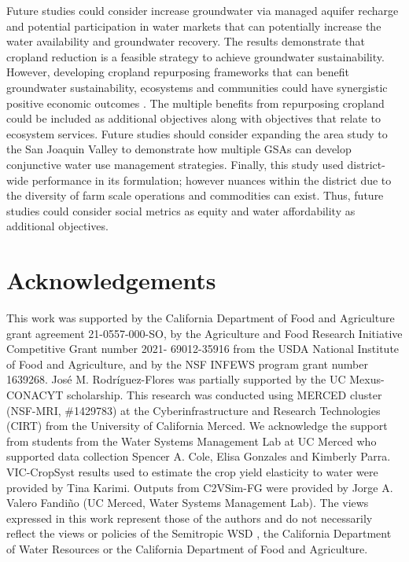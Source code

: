 \documentclass[a4paper,fleqn]{cas-sc}
\begin{document}
Future studies could consider increase groundwater via managed aquifer recharge \citep{alam_can_2020} and potential participation in water markets \citep{arellano-gonzalez_adaptive_2021,hanak_water_2019} that can potentially increase the water availability and groundwater recovery. The results demonstrate that cropland reduction is a feasible strategy to achieve groundwater sustainability. However, developing cropland repurposing frameworks that can benefit groundwater sustainability, ecosystems and communities could have synergistic positive economic outcomes \citep{biggs_landowner_2022,fernandez-bou_water_2023,espinoza_fallow_2023}. The multiple benefits from repurposing cropland could be included as additional objectives along with objectives that relate to ecosystem services. Future studies should consider expanding the area study to the San Joaquin Valley to demonstrate how multiple GSAs can develop conjunctive water use management strategies. Finally, this study used district-wide performance in its formulation; however nuances within the district due to the diversity of farm scale operations and commodities can exist. Thus, future studies could consider social metrics as equity and water affordability as additional objectives.  

\section*{Acknowledgements}

This work was supported by the California Department of Food and Agriculture grant agreement 21-0557-000-SO, by the Agriculture and Food Research Initiative Competitive Grant number 2021- 69012-35916 from the USDA National Institute of Food and Agriculture, and by the NSF INFEWS program grant number 1639268. José M. Rodríguez-Flores was partially supported by the UC Mexus-CONACYT scholarship. This research was conducted using MERCED cluster (NSF-MRI, \#1429783) at the Cyberinfrastructure and Research Technologies (CIRT) from the University of California Merced. We acknowledge the support from students from the Water Systems Management Lab at UC Merced who supported data collection Spencer A. Cole, Elisa Gonzales and Kimberly Parra. VIC-CropSyst results used to estimate the crop yield elasticity to water were provided by Tina Karimi. Outputs from  C2VSim-FG were provided by Jorge A. Valero Fandiño (UC Merced, Water Systems Management Lab). The views expressed in this work represent those of the authors and do not necessarily reflect the views or policies of the Semitropic WSD , the California Department of Water Resources or the California Department of Food and Agriculture. 
\end{document}

